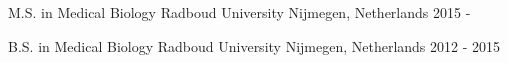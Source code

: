 

\begin{cventries}

\cventry
  {M.S. in Medical Biology} %
  {Radboud University} %
  {Nijmegen, Netherlands} %
  {2015 - } %
  {}


\cventry
  {B.S. in Medical Biology} %
  {Radboud University} %
  {Nijmegen, Netherlands} %
  {2012 - 2015} %
  {}



\end{cventries}